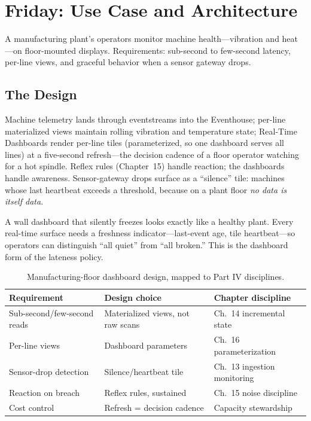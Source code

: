 \section{Friday: Use Case and Architecture}
A manufacturing plant's operators monitor machine health---vibration and heat---on floor-mounted displays. Requirements: sub-second to few-second latency, per-line views, and graceful behavior when a sensor gateway drops.

\subsection{The Design}
Machine telemetry lands through eventstreams into the Eventhouse; per-line materialized views maintain rolling vibration and temperature state; Real-Time Dashboards render per-line tiles (parameterized, so one dashboard serves all lines) at a five-second refresh---the decision cadence of a floor operator watching for a hot spindle. Reflex rules (Chapter~15) handle reaction; the dashboards handle awareness. Sensor-gateway drops surface as a ``silence'' tile: machines whose last heartbeat exceeds a threshold, because on a plant floor \emph{no data is itself data}.

\begin{pitfall}
A wall dashboard that silently freezes looks exactly like a healthy plant. Every real-time surface needs a freshness indicator---last-event age, tile heartbeat---so operators can distinguish ``all quiet'' from ``all broken.'' This is the dashboard form of the lateness policy.
\end{pitfall}

\begin{table}[H]
\centering
\small
\begin{tabular}{@{}p{4.4cm}p{4.6cm}p{4.6cm}@{}}
\toprule
\textbf{Requirement} & \textbf{Design choice} & \textbf{Chapter discipline} \\
\midrule
Sub-second/few-second reads & Materialized views, not raw scans & Ch.~14 incremental state \\
Per-line views & Dashboard parameters & Ch.~16 parameterization \\
Sensor-drop detection & Silence/heartbeat tile & Ch.~13 ingestion monitoring \\
Reaction on breach & Reflex rules, sustained & Ch.~15 noise discipline \\
Cost control & Refresh = decision cadence & Capacity stewardship \\
\bottomrule
\end{tabular}
\caption{Manufacturing-floor dashboard design, mapped to Part IV disciplines.}
\label{tab:chapter16-manufacturing}
\end{table}

